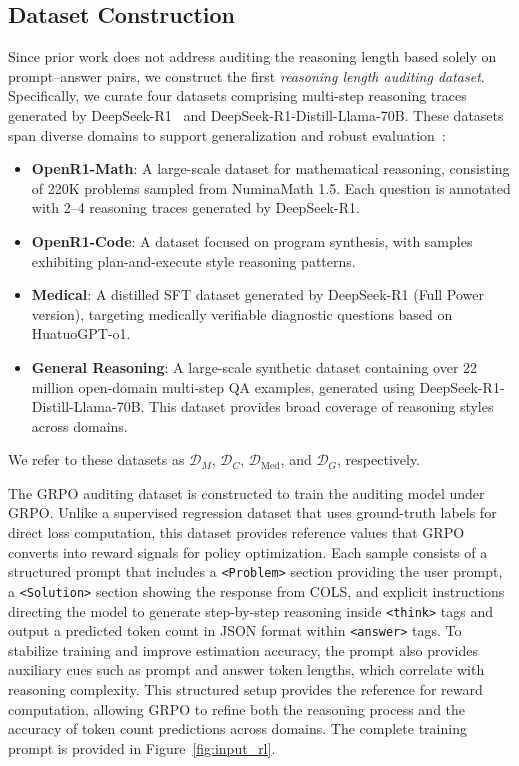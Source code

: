 \documentclass[pdflatex,sn-mathphys-num]{sn-jnl}%
\theoremstyle{thmstyleone}%
\theoremstyle{thmstyletwo}%
\theoremstyle{thmstylethree}%
\begin{document}
\subsection{Dataset Construction}
\label{sec:dataset}

Since prior work does not address auditing the reasoning length based solely on prompt--answer pairs, we construct the first \textit{reasoning length auditing dataset}. Specifically, we curate four datasets comprising multi-step reasoning traces generated by DeepSeek-R1~\citep{guo2025deepseek} and DeepSeek-R1-Distill-Llama-70B. These datasets span diverse domains to support generalization and robust evaluation~\citep{openr1}:

\begin{itemize}
    \item \textbf{OpenR1-Math}: A large-scale dataset for mathematical reasoning, consisting of 220K problems sampled from NuminaMath 1.5. Each question is annotated with 2--4 reasoning traces generated by DeepSeek-R1.

    \item \textbf{OpenR1-Code}: A dataset focused on program synthesis, with samples exhibiting plan-and-execute style reasoning patterns.

    \item \textbf{Medical}: A distilled SFT dataset generated by DeepSeek-R1 (Full Power version), targeting medically verifiable diagnostic questions based on HuatuoGPT-o1.

    \item \textbf{General Reasoning}: A large-scale synthetic dataset containing over 22 million open-domain multi-step QA examples, generated using DeepSeek-R1-Distill-Llama-70B. This dataset provides broad coverage of reasoning styles across domains.
\end{itemize}

We refer to these datasets as $\mathcal{D}_M$, $\mathcal{D}_C$, $\mathcal{D}_{\text{Med}}$, and $\mathcal{D}_G$, respectively.


The GRPO auditing dataset is constructed to train the auditing model under GRPO. Unlike a supervised regression dataset that uses ground-truth labels for direct loss computation, this dataset provides reference values that GRPO converts into reward signals for policy optimization.  
Each sample consists of a structured prompt that includes a \texttt{<Problem>} section providing the user prompt, a \texttt{<Solution>} section showing the response from COLS, and explicit instructions directing the model to generate step-by-step reasoning inside \texttt{<think>} tags and output a predicted token count in JSON format within \texttt{<answer>} tags. To stabilize training and improve estimation accuracy, the prompt also provides auxiliary cues such as prompt and answer token lengths, which correlate with reasoning complexity. This structured setup provides the reference for reward computation, allowing GRPO to refine both the reasoning process and the accuracy of token count predictions across domains. The complete training prompt is provided in Figure~\ref{fig:input_rl}.
\end{document}
